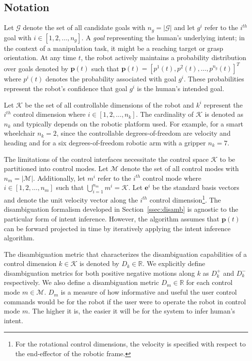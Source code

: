 \subsection{Notation}\label{ssec:notation}
Let $\mathcal{G}$ denote the set of all candidate goals with $n_g = \vert\mathcal{G}\vert$ and let $g^i$ refer to the $i^{th}$ goal with $i \in [1,2,\dots, n_g]$. A \textit{goal} representing the human's underlying intent; in the context of a manipulation task, it might be a reaching target or grasp orientation. At any time $t$, the robot actively maintains a probability distribution over goals denoted by $\boldsymbol{p}(t)$ such that $\boldsymbol{p}(t) = [p^1(t), p^2(t),\dots, p^{n_g}(t)]^{T}$ where $p^i(t)$ denotes the probability associated with goal $g^i$.  These probabilities represent the robot's confidence that goal $g^i$ is the human's intended goal. 

Let $\mathcal{K}$ be the set of all controllable dimensions of the robot and $k^i$ represent the $i^{th}$ control dimension where $i \in [1,2,\dots,n_k]$. The cardinality of $\mathcal{K}$ is denoted as $n_k$ and typically depends on the robotic platform used. For example, for a smart wheelchair $n_k = 2$, since the controllable degrees-of-freedom are velocity and heading and for a six degrees-of-freedom robotic arm with a gripper $n_k = 7$. 

The limitations of the control interfaces necessitate the control space $\mathcal{K}$ to be partitioned into control modes. Let $\mathcal{M}$ denote the set of all control modes with $n_m = \vert\mathcal{M}\vert$. Additionally, let $m^i$ refer to the $i^{th}$ control mode where $i \in [1,2,\dots,n_m]$  such that $\bigcup\limits_{i=1}^{n_m} m^i = \mathcal{K}$. Let $\boldsymbol{e}^i$ be the standard basis vectors and denote the unit velocity vector along the $i^{th}$ control dimension\footnote{For the rotational control dimensions, the velocity is specified with respect to the end-effector of the robotic frame.}. The disambiguation formalism developed in Section~\ref{ssec:disamb} is agnostic to the particular form of intent inference. However, the algorithm assumes that $\boldsymbol{p}(t)$ can be forward projected in time by iteratively applying the intent inference algorithm. 

The disambiguation metric that characterizes the disambiguation capabilities of a control dimension $k \in \mathcal{K}$ is denoted by $D_k \in \mathbb{R}$. We explicitly define disambiguation metrics for both positive negative motions along $k$ as $D_k^{+}$ and $D_k^{-}$ respectively. We also define a disambiguation metric $D_m \in \mathbb{R}$ for each control mode $m \in \mathcal{M}$. $D_m$ is a measure of how informative and useful the user control commands would be for the robot if the user were to operate the robot in control mode $m$. The higher it is, the easier it will be for the system to infer human's intent. 


